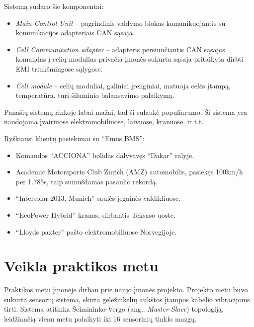 \documentclass[12pt, a4paper, lithuanian, final]{article}
\begin{document}
Sistemą sudaro šie komponentai:
\begin{itemize}
	\item{\textit{Main Control Unit}} -- pagrindinis valdymo blokas komunikuojantis su komunikacijos adapteriais CAN sąsaja.
	\item{\textit{Cell Communication adapter}} -- adapteris persiunčiantis CAN sąsajos komandas į celių modulius privačia įmonės sukurta sąsaja pritaikyta dirbti EMI triukšmingose sąlygose.
	\item{\textit{Cell module}} -- celių moduliai, galiniai įrenginiai, matuoja celės įtampą, temperatūra, turi šiluminio balansavimo palaikymą.
\end{itemize}

Panašių sistemų rinkoje labai mažai, tad ši sulaukė populiarumo.
Ši sistema yra naudojama įvairiuose elektromobiliuose, laivuose, kranuose. ir t.t.

Ryškiausi klientų pasiekimai su "`Emus BMS"':
\begin{itemize}
	\item Komandos "`ACCIONA"' bolidas dalyvavęs "`Dakar"' ralyje.
	\item Academic Motorsports Club Zurich (AMZ) automobilis, pasiekęs 100km/h per 1.785s, taip sumušdamas pasaulio rekordą.
	\item "`Intersolar 2013, Munich"' saulės jegainės valdikliuose.
	\item "`EcoPower Hybrid"' kranas, dirbantis Teksaso uoste.
	\item "`Lloyds paxter"' pašto elektromobiliuose Norvegijoje.
\end{itemize}











\section{Veikla praktikos metu}

Praktikos metu įmonėje dirbau prie naujo įmonės projekto.
Projekto metu buvo sukurta sensorių sistema, skirta geležinkelių aukštos įtampos kabelio vibracijoms tirti.
Sistema atitinka Šeimininko-Vergo (ang.: \textit{Master-Slave}) topologiją, leidžiančią vienu metu palaikyti iki 16 sensorinių tinklo mazgų.
\end{document}
